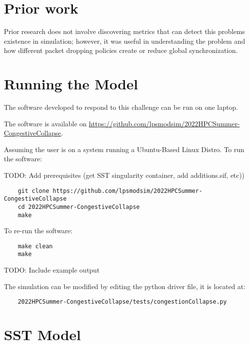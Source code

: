 \documentclass{article}
\begin{document}
\section{Prior work} %
Prior research \cite{Bashi2017} does not involve discovering metrics that can detect this problems existence in simulation; however, it was useful in understanding the problem and how different packet dropping policies create or reduce global synchronization.

\section{Running the Model}

The software developed to respond to this challenge can be run on one laptop.

\noindent The software is available on \href{https://github.com/lpsmodsim/2022HPCSummer-CongestiveCollapse}{https://github.com/lpsmodsim/2022HPCSummer-CongestiveCollapse}.\newline

\noindent Assuming the user is on a system running a Ubuntu-Based Linux Distro. To run the software:

\noindent TODO: Add prerequisites (get SST singularity container, add additions.sif, etc))

\begin{verbatim}
	git clone https://github.com/lpsmodsim/2022HPCSummer-CongestiveCollapse
	cd 2022HPCSummer-CongestiveCollapse
	make
\end{verbatim}

\noindent To re-run the software:

\begin{verbatim}
	make clean
	make
\end{verbatim}

\noindent TODO: Include example output\newline

\noindent The simulation can be modified by editing the python driver file, it is located at:

\begin{verbatim}
	2022HPCSummer-CongestiveCollapse/tests/congestionCollapse.py
\end{verbatim}

\section{SST Model}
\end{document}
